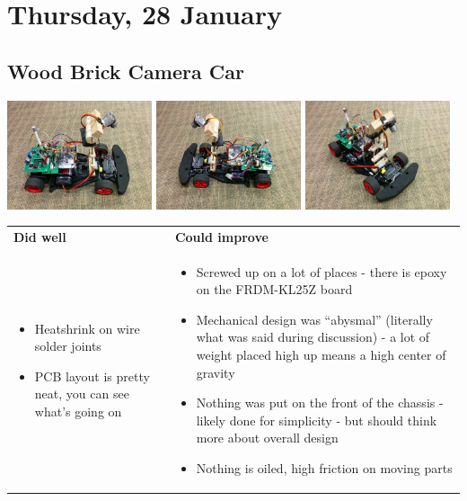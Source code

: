 \documentclass{article}
\begin{document}
\section{Thursday, 28 January}
\subsection{Wood Brick Camera Car}
{\centering
\includegraphics[width=0.32\textwidth]{images-dis2-carcritiques/brickcar-side1}
\includegraphics[width=0.32\textwidth]{images-dis2-carcritiques/brickcar-side2}
\includegraphics[width=0.32\textwidth]{images-dis2-carcritiques/brickcar-angle} \\}

\begin{tabularx}{\textwidth}{X X}
\textbf{Did well} & \textbf{Could improve} \\
\begin{itemize}
  \item Heatshrink on wire solder joints
  \item PCB layout is pretty neat, you can see what's going on

\end{itemize}
&
\begin{itemize}
  \item Screwed up on a lot of places - there is epoxy on the FRDM-KL25Z board
  \item Mechanical design was ``abysmal'' (literally what was said during discussion) - a lot of weight placed high up means a high center of gravity
  \item Nothing was put on the front of the chassis - likely done for simplicity - but should think more about overall design
  \item Nothing is oiled, high friction on moving parts
\end{itemize}
\end{tabularx}
\end{document}
